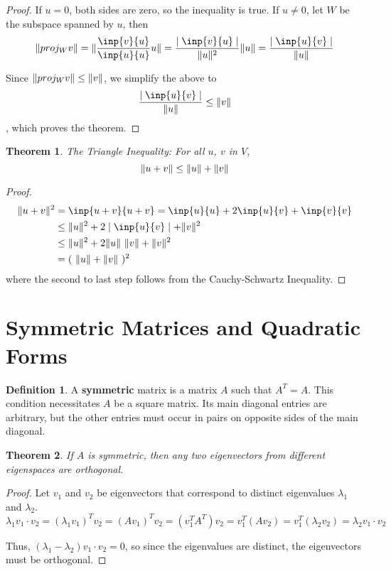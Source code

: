 \documentclass[letterpaper]{article}
\newtheorem{theorem}{Theorem}
\theoremstyle{definition}
\newtheorem{definition}{Definition}[section]
\DeclarePairedDelimiter{\norm}{\lVert}{\rVert}
\begin{document}
\begin{proof}
If $u = 0$, both sides are zero, so the inequality is true. If $u \neq 0$, let $W$ be the subspace spanned by $u$, then 
$$\norm{proj_{W} v} = \norm{\frac{\inp{v}{u}}{\inp{u}{u}}u} = \frac{\mid \inp{v}{u} \mid}{\norm{u}^{2}} \norm{u} = \frac{\mid \inp{u}{v} \mid}{\norm{u}}$$

Since $\norm{proj_{W}v} \leq \norm{v}$, we simplify the above to $$\frac{\mid \inp{u}{v} \mid}{\norm{u}} \leq \norm{v}$$, which proves the theorem. 
\end{proof}

\begin{theorem}{The Triangle Inequality: }
For all $u$, $v$ in $V$, 
$$\norm{u + v} \leq \norm{u} + \norm{v}$$
\end{theorem}

\begin{proof}
\begin{equation}
\begin{split}
\norm{u + v}^{2} &= \inp{u + v}{u + v} = \inp{u}{u} + 2\inp{u}{v} + \inp{v}{v} \\
&\leq \norm{u}^{2} + 2 \mid \inp{u}{v} \mid + \norm{v}^{2} \\
&\leq \norm{u}^{2} + 2 \norm{u} \ \norm{v} + \norm{v}^{2} \\
&= (\ \norm{u} + \norm{v} \ )^{2}
\end{split}
\end{equation}
where the second to last step follows from the Cauchy-Schwartz Inequality. 
\end{proof}

\section{Symmetric Matrices and Quadratic Forms}
\begin{definition}
A \textbf{symmetric} matrix is a matrix $A$ such that $A^{T} = A$. This condition necessitates $A$ be a square matrix. Its main diagonal entries are arbitrary, but the other entries must occur in pairs on opposite sides of the main diagonal.
\end{definition}

\begin{theorem}
If $A$ is symmetric, then any two eigenvectors from different eigenspaces are orthogonal. 
\end{theorem}

\begin{proof}
Let $v_1$ and $v_2$ be eigenvectors that correspond to distinct eigenvalues $\lambda_1$ and $\lambda_2$.
$$\lambda_1 v_1 \cdot v_2 = (\lambda_1 v_1)^{T} v_2 = (Av_1)^{T}v_2 = (v_{1}^{T} A^{T}) v_{2} = v_{1}^{T} (Av_{2}) = v_{1}^{T} (\lambda_{2} v_{2}) =\lambda_{2} v_{1} \cdot v_{2}$$

Thus, $(\lambda_1 - \lambda_2) v_1 \cdot v_2 = 0$, so since the eigenvalues are distinct, the eigenvectors must be orthogonal. 
\end{proof}
\end{document}
